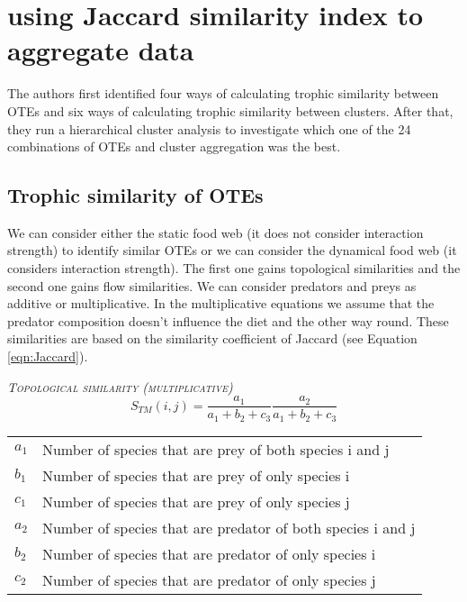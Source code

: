 \documentclass{article}
\makeatletter
\newenvironment{conditions}
  {\par\vspace{\abovedisplayskip}\noindent\begin{tabular}{>{$}l<{$} @{${}={}$} l}}
  {\end{tabular}\par\vspace{\belowdisplayskip}}
\makeatother
\begin{document}
\section{\citet{Yodzis1999} using Jaccard similarity index to aggregate data }
The authors first identified four ways of calculating trophic similarity between OTEs and six ways of calculating trophic similarity between clusters. 
After that, they run a hierarchical cluster analysis to investigate which one of the 24 combinations of OTEs and cluster aggregation was the best. 






    \subsection{Trophic similarity of OTEs}
    We can consider either the static food web (it does not consider interaction strength) to identify similar OTEs or we can consider the dynamical food web (it considers interaction strength). 
    The first one gains topological similarities and the second one gains flow similarities. 
    We can consider predators and preys as additive or multiplicative. In the multiplicative equations we assume that the predator composition doesn't influence the diet and the other way round. 
    These similarities are based on the similarity coefficient of Jaccard (see Equation \ref{eqn:Jaccard}). 



    \bigskip
    \noindent \textrm{\textsc{\textsl{Topological similarity (multiplicative)}}} 
    \begin{equation}
        S_{TM}(i,j)=\frac{a_1}{a_1+b_2+c_3}\frac{a_2}{a_1+b_2+c_3}
    \end{equation}
    \begin{conditions}
        a_1 & Number of species that are prey of both species i and j \\
        b_1 & Number of species that are prey of only species i \\
        c_1 & Number of species that are prey of only species j \\
        a_2 & Number of species that are predator of both species i and j \\
        b_2 & Number of species that are predator of only species i \\
        c_2 & Number of species that are predator of only species j \\
    \end{conditions}
\end{document}
